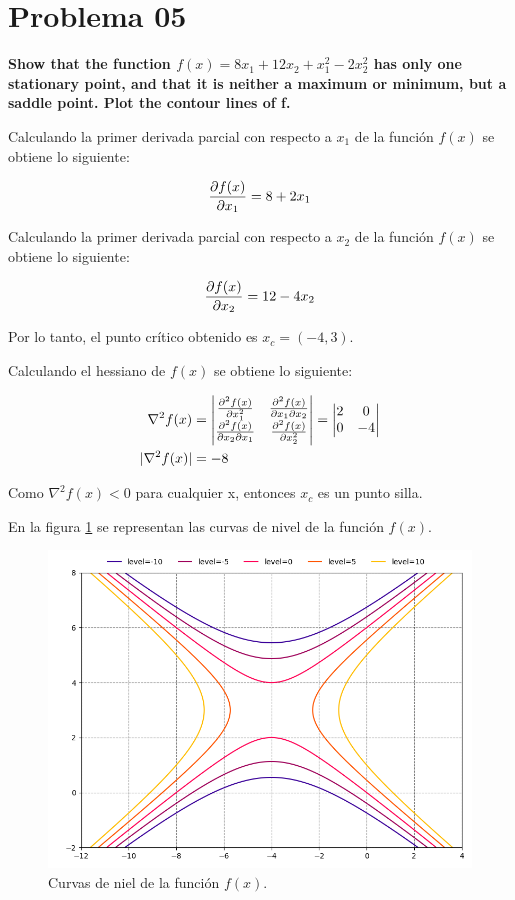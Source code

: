\pagebreak

\section*{Problema 05}

\textbf{Show that the function $f (x) = 8x_1 + 12x_2 + x^2_1 - 2x_2^2$ has only one stationary point, and that it is neither a maximum or minimum, but a saddle point. Plot the contour lines of f.}

Calculando la primer derivada parcial con respecto a $x_1$ de la función $f(x)$ se obtiene lo siguiente:

\begin{equation*}
    \frac{\partial f(x)}{\partial x_1} = 8+2x_1
\end{equation*}

Calculando la primer derivada parcial con respecto a $x_2$ de la función $f(x)$ se obtiene lo siguiente:

\begin{equation*}
    \frac{\partial f(x)}{\partial x_2} = 12-4x_2
\end{equation*}

Por lo tanto, el punto crítico obtenido es $x_c=(-4,3)$.

Calculando el hessiano de $f(x)$ se obtiene lo siguiente:

\begin{align*}
    \nabla^2 f(x)   & = \begin{vmatrix}
        \frac{\partial ^2f(x)}{\partial x_1^2}           & \frac{\partial ^2f(x)}{\partial x_1\partial x_2} \\
        \frac{\partial ^2f(x)}{\partial x_2\partial x_1} & \frac{\partial ^2f(x)}{\partial x_2^2}
    \end{vmatrix} = \begin{vmatrix}
        2 & 0  \\
        0 & -4
    \end{vmatrix} \\
    |\nabla^2 f(x)| & = -8
\end{align*}

Como $\nabla^2 f(x)<0$ para cualquier x, entonces $x_c$ es un punto silla.

En la figura \ref{fig:problem_5} se representan las curvas de nivel de la función $f(x)$.

\begin{figure}[H]
    \centering
    \includegraphics[width=12cm]{Graphics/problem05.png}
    \caption{Curvas de niel de la función $f(x)$.}
    \label{fig:problem_5}
\end{figure}
